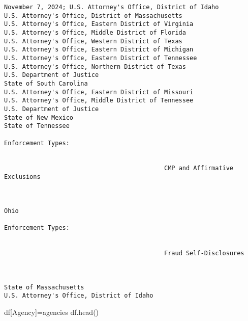 \documentclass[
  letterpaper,
  DIV=11,
  numbers=noendperiod]{scrartcl}
\newenvironment{Shaded}{\begin{snugshade}}{\end{snugshade}}
\newcommand{\NormalTok}[1]{\textcolor[rgb]{0.00,0.23,0.31}{#1}}
\newcommand{\OperatorTok}[1]{\textcolor[rgb]{0.37,0.37,0.37}{#1}}
\newcommand{\StringTok}[1]{\textcolor[rgb]{0.13,0.47,0.30}{#1}}
\begin{document}
\begin{verbatim}
November 7, 2024; U.S. Attorney's Office, District of Idaho
U.S. Attorney's Office, District of Massachusetts
U.S. Attorney's Office, Eastern District of Virginia
U.S. Attorney's Office, Middle District of Florida
U.S. Attorney's Office, Western District of Texas
U.S. Attorney's Office, Eastern District of Michigan
U.S. Attorney's Office, Eastern District of Tennessee
U.S. Attorney's Office, Northern District of Texas
U.S. Department of Justice
State of South Carolina
U.S. Attorney's Office, Eastern District of Missouri
U.S. Attorney's Office, Middle District of Tennessee
U.S. Department of Justice
State of New Mexico
State of Tennessee

Enforcement Types:


                                            CMP and Affirmative Exclusions
                                        


Ohio

Enforcement Types:


                                            Fraud Self-Disclosures
                                        


State of Massachusetts
U.S. Attorney's Office, District of Idaho
\end{verbatim}

\begin{Shaded}
\begin{Highlighting}[]
\NormalTok{df[}\StringTok{\textquotesingle{}Agency\textquotesingle{}}\NormalTok{]}\OperatorTok{=}\NormalTok{agencies}
\NormalTok{df.head()}
\end{Highlighting}
\end{Shaded}
\end{document}

